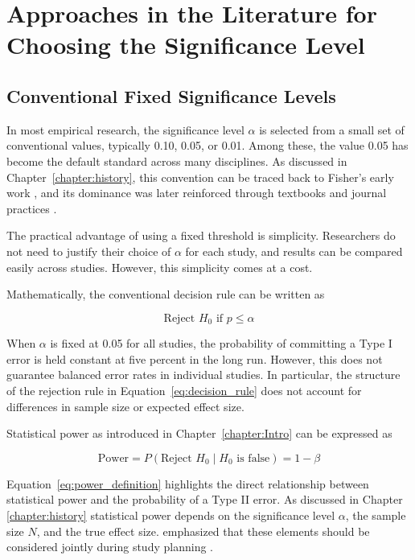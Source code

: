 
\chapter{Approaches in the Literature for Choosing the Significance Level}
\label{chapter:existing approaches}
\section{Conventional Fixed Significance Levels}

In most empirical research, the significance level $\alpha$ is selected from a small set of conventional values, typically 0.10, 0.05, or 0.01. Among these, the value 0.05 has become the default standard across many disciplines. As discussed in Chapter~\ref{chapter:history}, this convention can be traced back to Fisher’s early work \cite{Fisher1925}, and its dominance was later reinforced through textbooks and journal practices \cite{CowlesDavis1982}.

The practical advantage of using a fixed threshold is simplicity. Researchers do not need to justify their choice of $\alpha$ for each study, and results can be compared easily across studies. However, this simplicity comes at a cost.

Mathematically, the conventional decision rule can be written as

\begin{equation}
	\text{Reject } H_0 \text{ if } p \leq \alpha
	\label{eq:decision_rule}
\end{equation}

When $\alpha$ is fixed at 0.05 for all studies, the probability of committing a Type I error is held constant at five percent in the long run. However, this does not guarantee balanced error rates in individual studies. In particular, the structure of the rejection rule in Equation~\ref{eq:decision_rule} does not account for differences in sample size or expected effect size.

Statistical power as introduced in Chapter~\ref{chapter:Intro} can be expressed as

\begin{equation}
	\text{Power} = P(\text{Reject } H_0 \mid H_0 \text{ is false}) = 1 - \beta
	\label{eq:power_definition}
\end{equation}

Equation~\ref{eq:power_definition} highlights the direct relationship between statistical power and the probability of a Type II error. As discussed in Chapter \ref{chapter:history} statistical power depends on the significance level $\alpha$, the sample size $N$, and the true effect size. \cite{Cohen1988} emphasized that these elements should be considered jointly during study planning .

